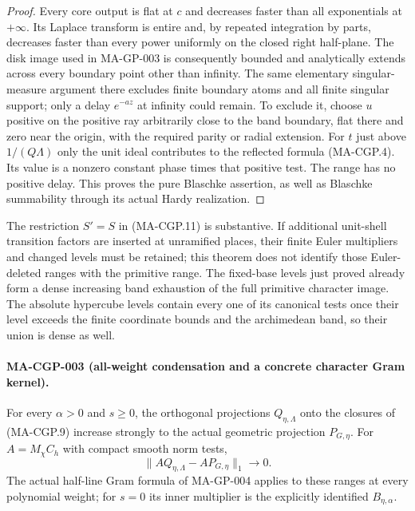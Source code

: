 \begin{proof}
Every core output is flat at $c$ and decreases faster than
all exponentials at $+\infty$.  Its Laplace transform is
entire and, by repeated integration by parts, decreases faster
than every power uniformly on the closed right half-plane.
The disk image used in MA-GP-003 is consequently bounded
and analytically extends across every boundary point other
than infinity.  The same elementary singular-measure argument
there excludes finite boundary atoms and all finite singular
support; only a delay $e^{-az}$ at infinity could remain.
To exclude it, choose $u$ positive on the positive ray arbitrarily
close to the band boundary, flat there and zero near the origin,
with the required parity or radial extension.  For $t$ just
above $1/(Q\Lambda)$ only the unit ideal contributes to the
reflected formula (MA-CGP.4).  Its value is a nonzero constant
phase times that positive test.  The range has no positive
delay.  This proves the pure Blaschke assertion, as well as
Blaschke summability through its actual Hardy realization.
\end{proof}

The restriction $S'=S$ in (MA-CGP.11) is substantive.  If
additional unit-shell transition factors are inserted at
unramified places, their finite Euler multipliers and changed
levels must be retained; this theorem does not identify those
Euler-deleted ranges with the primitive range.  The fixed-base
levels just proved already form a dense increasing band exhaustion of
the full primitive character image.  The absolute hypercube
levels contain every one of its canonical tests once their
level exceeds the finite coordinate bounds and the
archimedean band, so their union is dense as well.

\paragraph{MA-CGP-003 (all-weight condensation and a concrete character Gram kernel).}
For every $\alpha>0$ and $s\ge0$, the orthogonal projections
$Q_{\eta,\Lambda}$ onto the closures of (MA-CGP.9) increase
strongly to the actual geometric projection $P_{G,\eta}$.
For $A=M_\chi C_h$ with compact smooth norm tests,
\[
       \|AQ_{\eta,\Lambda}-AP_{G,\eta}\|_1\longrightarrow0.
 \tag{MA-CGP.14}
\]
The actual half-line Gram formula of MA-GP-004 applies to
these ranges at every polynomial weight; for $s=0$ its
inner multiplier is the explicitly identified $B_{\eta,\alpha}$.

